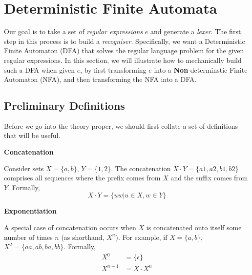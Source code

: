 \section{Deterministic Finite Automata}
Our goal is to take a set of \textit{regular expressions} $e$ and generate a \textit{lexer}. The first step in this process is to build a \textit{recogniser}. Specifically, we want a Deterministic Finite Automaton (DFA) that solves the regular language problem for the given regular expressions. In this section, we will illustrate how to mechanically build such a DFA when given $e$, by first transforming $e$ into a \textbf{Non}-determinstic Finite Automaton (NFA), and then transforming the NFA into a DFA.

\makeatletter

\def\*{\@postfix*}

\def\@postfix#1{{#1}\@ifnextchar){}{\;}}

\makeatother

\subsection{Preliminary Definitions}
Before we go into the theory proper, we should first collate a set of definitions that will be useful. 

\begin{minipage}[t]{0.2\textwidth}
    \textbf{\textsf{Concatenation}}
\end{minipage}%
\begin{minipage}[t]{0.8\textwidth}
Consider sets $X = \{a, b\}$, $Y = \{1, 2\}$. The concatenation $X \cdot Y = \{a1, a2, b1, b2\}$ comprises all sequences where the prefix comes from $X$ and the suffix comes from $Y$. Formally, \[X \cdot Y = \{uw | u \in X, w \in Y \}\]
\end{minipage}\par

\begin{minipage}[t]{0.2\textwidth}
    \textbf{\textsf{Exponentiation}}
\end{minipage}%
\begin{minipage}[t]{0.8\textwidth}
A special case of concatenation occurs when $X$ is concatenated onto itself some number of times $n$ (as shorthand, $X^n$). For example, if $X = \{a, b\}$, $X^2 = \{aa, ab, ba, bb\}$. Formally, 
\begin{align*}
    X^{0} &= \{ \epsilon \} \\
    X^{n+1} &= X \cdot X^n
\end{align*}
\end{minipage}\par

